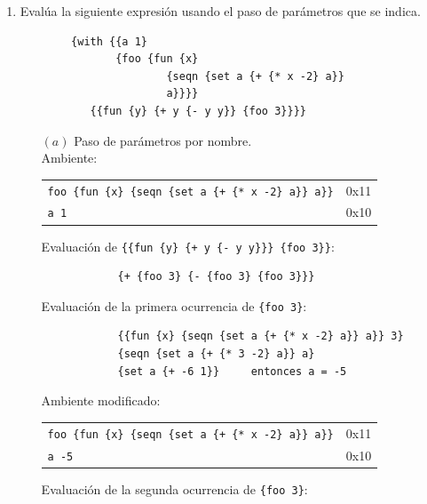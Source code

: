 \documentclass[letterpaper,11pt]{article}
\begin{document}
\begin{enumerate}
    \item Evalúa la siguiente expresión usando el paso de parámetros que se indica.
    \begin{verbatim}
        {with {{a 1}
               {foo {fun {x}
                       {seqn {set a {+ {* x -2} a}}
                       a}}}}
           {{fun {y} {+ y {- y y}} {foo 3}}}}
    \end{verbatim}
    \begin{itemize}
        \item [$(a)$] Paso de parámetros por nombre.\\
        Ambiente:
        \begin{center}
            \begin{tabular}{|l| c }
            \cline{1-1}
                \texttt{foo \hspace{1cm} \{fun \{x\} \{seqn \{set a \{+ \{* x -2\} a\}\} a\}\}} & 0x11\\\cline{1-1}
                \texttt{a \hspace{1.4cm} 1} & 0x10\\\cline{1-1}
            \end{tabular}
        \end{center}
        Evaluación de \texttt{\{\{fun \{y\} \{+ y \{- y y\}\}\} \{foo 3\}\}}:
        \begin{verbatim}
            {+ {foo 3} {- {foo 3} {foo 3}}}
        \end{verbatim}
        Evaluación de la primera ocurrencia de \texttt{\{foo 3\}}:
        \begin{verbatim}
            {{fun {x} {seqn {set a {+ {* x -2} a}} a}} 3}
            {seqn {set a {+ {* 3 -2} a}} a}
            {set a {+ -6 1}}     entonces a = -5
        \end{verbatim}
        Ambiente modificado:
        \begin{center}
            \begin{tabular}{|l| c }
            \cline{1-1}
                \texttt{foo \hspace{1cm} \{fun \{x\} \{seqn \{set a \{+ \{* x -2\} a\}\} a\}\}} & 0x11\\\cline{1-1}
                \texttt{a \hspace{1.4cm} -5} & 0x10\\\cline{1-1}
            \end{tabular}
        \end{center}
        Evaluación de la segunda ocurrencia de \texttt{\{foo 3\}}:

\end{itemize}
\end{enumerate}
\end{document}
